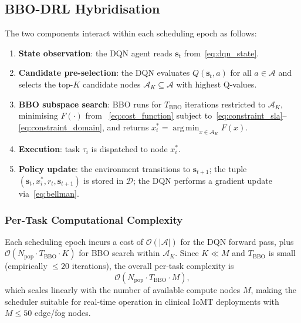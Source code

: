 \documentclass[journal,twoside,letterpaper]{IEEEtran}
\DeclareMathOperator*{\argmin}{arg\,min}
\newcommand{\vect}[1]{\mathbf{#1}}
\newcommand{\set}[1]{\mathcal{#1}}
\begin{document}
\subsection{BBO-DRL Hybridisation}
\label{subsec:hybrid}

The two components interact within each scheduling epoch as follows:
\begin{enumerate}
  \item \textbf{State observation}: the DQN agent reads $\vect{s}_t$
        from~\eqref{eq:dqn_state}.
  \item \textbf{Candidate pre-selection}: the DQN evaluates $Q(\vect{s}_t, a)$
        for all $a \in \set{A}$ and selects the top-$K$ candidate nodes
        $\set{A}_K \subseteq \set{A}$ with highest Q-values.
  \item \textbf{BBO subspace search}: BBO runs for $T_{\mathrm{BBO}}$
        iterations restricted to $\set{A}_K$, minimising $F(\cdot)$ from
        ~\eqref{eq:cost_function} subject to~\eqref{eq:constraint_sla}--\eqref{eq:constraint_domain},
        and returns $x_i^* = \argmin_{x \in \set{A}_K} F(x)$.
  \item \textbf{Execution}: task $\tau_i$ is dispatched to node $x_i^*$.
  \item \textbf{Policy update}: the environment transitions to
        $\vect{s}_{t+1}$; the tuple $(\vect{s}_t, x_i^*, r_t, \vect{s}_{t+1})$
        is stored in $\set{D}$; the DQN performs a gradient update
        via~\eqref{eq:bellman}.
\end{enumerate}

\subsubsection{Per-Task Computational Complexity}

Each scheduling epoch incurs a cost of $\mathcal{O}(|\set{A}|)$ for the DQN
forward pass, plus $\mathcal{O}(N_{\mathrm{pop}} \cdot T_{\mathrm{BBO}} \cdot K)$
for BBO search within $\set{A}_K$.  Since $K \ll M$ and $T_{\mathrm{BBO}}$
is small (empirically $\leq 20$ iterations), the overall per-task complexity is
\begin{equation}
  \mathcal{O}\!\left(N_{\mathrm{pop}} \cdot T_{\mathrm{BBO}} \cdot M\right),
  \label{eq:complexity}
\end{equation}
which scales linearly with the number of available compute nodes $M$,
making the scheduler suitable for real-time operation in clinical IoMT
deployments with $M \leq 50$ edge/fog nodes.
\end{document}

